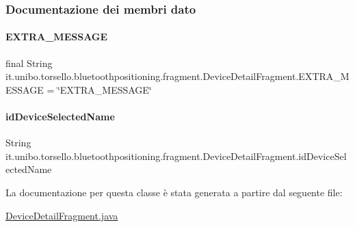 \subsubsection{Documentazione dei membri dato}
\hypertarget{classit_1_1unibo_1_1torsello_1_1bluetoothpositioning_1_1fragment_1_1DeviceDetailFragment_a9f7fff4a2b22105976f2c7223d88f9ae_a9f7fff4a2b22105976f2c7223d88f9ae}{}\label{classit_1_1unibo_1_1torsello_1_1bluetoothpositioning_1_1fragment_1_1DeviceDetailFragment_a9f7fff4a2b22105976f2c7223d88f9ae_a9f7fff4a2b22105976f2c7223d88f9ae} 
\paragraph{\texorpdfstring{E\+X\+T\+R\+A\+\_\+\+M\+E\+S\+S\+A\+GE}{EXTRA\_MESSAGE}}
{\footnotesize\ttfamily final String it.\+unibo.\+torsello.\+bluetoothpositioning.\+fragment.\+Device\+Detail\+Fragment.\+E\+X\+T\+R\+A\+\_\+\+M\+E\+S\+S\+A\+GE = \char`\"{}E\+X\+T\+R\+A\+\_\+\+M\+E\+S\+S\+A\+GE\char`\"{}\hspace{0.3cm}{\ttfamily [static]}}

\hypertarget{classit_1_1unibo_1_1torsello_1_1bluetoothpositioning_1_1fragment_1_1DeviceDetailFragment_a6d52d8371a07fb8da75879758d1d6942_a6d52d8371a07fb8da75879758d1d6942}{}\label{classit_1_1unibo_1_1torsello_1_1bluetoothpositioning_1_1fragment_1_1DeviceDetailFragment_a6d52d8371a07fb8da75879758d1d6942_a6d52d8371a07fb8da75879758d1d6942} 
\paragraph{\texorpdfstring{id\+Device\+Selected\+Name}{idDeviceSelectedName}}
{\footnotesize\ttfamily String it.\+unibo.\+torsello.\+bluetoothpositioning.\+fragment.\+Device\+Detail\+Fragment.\+id\+Device\+Selected\+Name\hspace{0.3cm}{\ttfamily [private]}}



La documentazione per questa classe è stata generata a partire dal seguente file\+:\begin{DoxyCompactItemize}
\item 
\hyperlink{DeviceDetailFragment_8java}{Device\+Detail\+Fragment.\+java}\end{DoxyCompactItemize}
